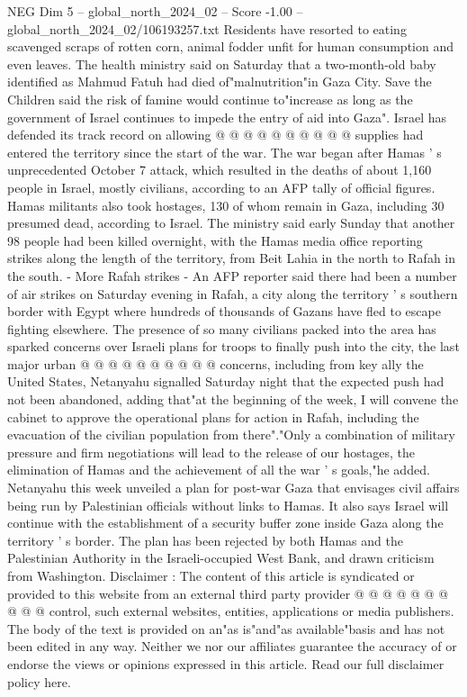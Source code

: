\begin{textsample}{NEG Dim 5 – global\_north\_2024\_02 – Score -1.00 – global\_north\_2024\_02/106193257.txt}
Residents have resorted to eating scavenged scraps of rotten corn, animal fodder unfit for human consumption and even leaves.
The health ministry said on Saturday that a two-month-old baby identified as Mahmud Fatuh had died of"malnutrition"in Gaza City.
Save the Children said the risk of famine would continue to"increase as long as the government of Israel continues to impede the entry of aid into Gaza".
Israel has defended its track record on allowing @ @ @ @ @ @ @ @ @ @ supplies had entered the territory since the start of the war.
The war began after Hamas ' s unprecedented October 7 attack, which resulted in the deaths of about 1,160 people in Israel, mostly civilians, according to an AFP tally of official figures.
Hamas militants also took hostages, 130 of whom remain in Gaza, including 30 presumed dead, according to Israel.
The ministry said early Sunday that another 98 people had been killed overnight, with the Hamas media office reporting strikes along the length of the territory, from Beit Lahia in the north to Rafah in the south. - More Rafah strikes - An AFP reporter said there had been a number of air strikes on Saturday evening in Rafah, a city along the territory ' s southern border with Egypt where hundreds of thousands of Gazans have fled to escape fighting elsewhere.
The presence of so many civilians packed into the area has sparked concerns over Israeli plans for troops to finally push into the city, the last major urban @ @ @ @ @ @ @ @ @ @ concerns, including from key ally the United States, Netanyahu signalled Saturday night that the expected push had not been abandoned, adding that"at the beginning of the week, I will convene the cabinet to approve the operational plans for action in Rafah, including the evacuation of the civilian population from there"."Only a combination of military pressure and firm negotiations will lead to the release of our hostages, the elimination of Hamas and the achievement of all the war ' s goals,"he added.
Netanyahu this week unveiled a plan for post-war Gaza that envisages civil affairs being run by Palestinian officials without links to Hamas.
It also says Israel will continue with the establishment of a security buffer zone inside Gaza along the territory ' s border.
The plan has been rejected by both Hamas and the Palestinian Authority in the Israeli-occupied West Bank, and drawn criticism from Washington.
Disclaimer : The content of this article is syndicated or provided to this website from an external third party provider @ @ @ @ @ @ @ @ @ @ control, such external websites, entities, applications or media publishers.
The body of the text is provided on an"as is"and"as available"basis and has not been edited in any way.
Neither we nor our affiliates guarantee the accuracy of or endorse the views or opinions expressed in this article.
Read our full disclaimer policy here.

\end{textsample}
